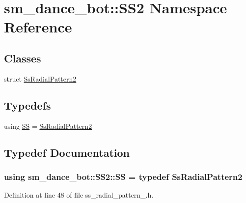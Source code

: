 \hypertarget{namespacesm__dance__bot_1_1SS2}{}\section{sm\+\_\+dance\+\_\+bot\+:\+:S\+S2 Namespace Reference}
\label{namespacesm__dance__bot_1_1SS2}
\subsection*{Classes}
\begin{DoxyCompactItemize}
\item 
struct \hyperlink{structsm__dance__bot_1_1SS2_1_1SsRadialPattern2}{Ss\+Radial\+Pattern2}
\end{DoxyCompactItemize}
\subsection*{Typedefs}
\begin{DoxyCompactItemize}
\item 
using \hyperlink{namespacesm__dance__bot_1_1SS2_a3af437d3b5fb32a00b12e171154d9165}{SS} = \hyperlink{structsm__dance__bot_1_1SS2_1_1SsRadialPattern2}{Ss\+Radial\+Pattern2}
\end{DoxyCompactItemize}


\subsection{Typedef Documentation}
\subsubsection[{\texorpdfstring{SS}{SS}}]{\setlength{\rightskip}{0pt plus 5cm}using {\bf sm\+\_\+dance\+\_\+bot\+::\+S\+S2\+::\+SS} = typedef {\bf Ss\+Radial\+Pattern2}}\hypertarget{namespacesm__dance__bot_1_1SS2_a3af437d3b5fb32a00b12e171154d9165}{}\label{namespacesm__dance__bot_1_1SS2_a3af437d3b5fb32a00b12e171154d9165}


Definition at line 48 of file ss\+\_\+radial\+\_\+pattern\+\_.\+h.

